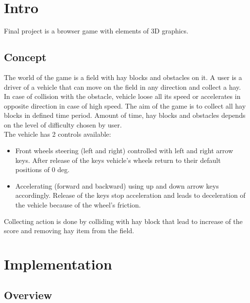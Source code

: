 \documentclass[12pt]{article}
\begin{document}

\tableofcontents
\pagebreak

\section{Intro}
Final project is a browser game with elements of 3D graphics.
\subsection{Concept}
The world of the game is a field with hay blocks and obstacles on it. A user is a driver of a vehicle that can move on the field in any direction and collect a hay. In case of collision with the obstacle, vehicle loose all its speed or accelerates in opposite direction in case of high speed. The aim of the game is to collect all hay blocks in defined time period.  Amount of time, hay blocks and obstacles depends on the level of difficulty chosen by user. 
\\
The vehicle has 2 controls available:
\begin{itemize}
\item {
Front wheels steering (left and right) controlled with left and right arrow keys. After release of the keys vehicle's wheels return to their default positions of 0 deg.
}
\item {
Accelerating (forward and backward) using up and down arrow keys accordingly. Release of the keys stop acceleration and leads to deceleration of the vehicle because of the wheel's friction.
}
\end{itemize}
Collecting action is done by colliding with hay block that lead to increase of the score and removing hay item from the field.

\newpage
\section{Implementation}
\subsection{Overview}
\end{document}
